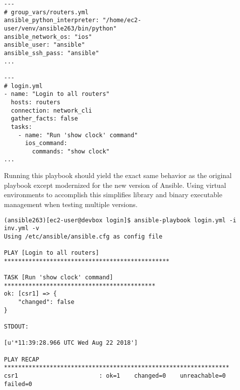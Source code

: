 \begin{verbatim}
---
# group_vars/routers.yml
ansible_python_interpreter: "/home/ec2-user/venv/ansible263/bin/python"
ansible_network_os: "ios"
ansible_user: "ansible"
ansible_ssh_pass: "ansible"
...

---
# login.yml
- name: "Login to all routers"
  hosts: routers
  connection: network_cli
  gather_facts: false
  tasks:
    - name: "Run 'show clock' command"
      ios_command:
        commands: "show clock"
...
\end{verbatim}

Running this playbook should yield the exact same behavior as the original
playbook except modernized for the new version of Ansible. Using virtual
environments to accomplish this simplifies library and binary executable
management when testing multiple versions.

\begin{verbatim}
(ansible263)[ec2-user@devbox login]$ ansible-playbook login.yml -i inv.yml -v
Using /etc/ansible/ansible.cfg as config file

PLAY [Login to all routers] ***********************************************

TASK [Run 'show clock' command] *******************************************
ok: [csr1] => {
    "changed": false
}

STDOUT:

[u'*11:39:28.966 UTC Wed Aug 22 2018']

PLAY RECAP ****************************************************************
csr1                       : ok=1    changed=0    unreachable=0    failed=0
\end{verbatim}
